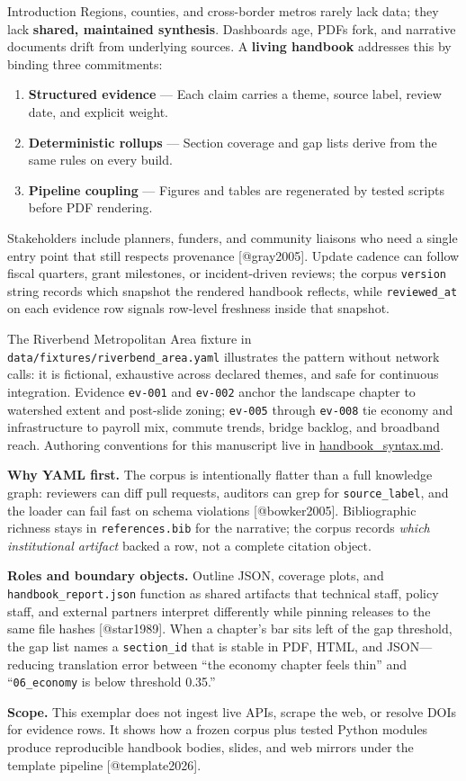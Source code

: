 \documentclass[
  ignorenonframetext,
]{beamer}
\author{\texorpdfstring{}{}}
\date{}
\providecommand{\tightlist}{%
  \setlength{\itemsep}{0pt}\setlength{\parskip}{0pt}}
\begin{document}
\begin{frame}[fragile]{Introduction}
\protect{}\label{introduction}
Regions, counties, and cross-border metros rarely lack data; they lack
\textbf{shared, maintained synthesis}. Dashboards age, PDFs fork, and
narrative documents drift from underlying sources. A \textbf{living
handbook} addresses this by binding three commitments:

\begin{enumerate}
\tightlist
\item
  \textbf{Structured evidence} --- Each claim carries a theme, source
  label, review date, and explicit weight.
\item
  \textbf{Deterministic rollups} --- Section coverage and gap lists
  derive from the same rules on every build.
\item
  \textbf{Pipeline coupling} --- Figures and tables are regenerated by
  tested scripts before PDF rendering.
\end{enumerate}

Stakeholders include planners, funders, and community liaisons who need
a single entry point that still respects provenance {[}@gray2005{]}.
Update cadence can follow fiscal quarters, grant milestones, or
incident-driven reviews; the corpus \texttt{version} string records
which snapshot the rendered handbook reflects, while
\texttt{reviewed\_at} on each evidence row signals row-level freshness
inside that snapshot.

The Riverbend Metropolitan Area fixture in
\texttt{data/fixtures/riverbend\_area.yaml} illustrates the pattern
without network calls: it is fictional, exhaustive across declared
themes, and safe for continuous integration. Evidence \texttt{ev-001}
and \texttt{ev-002} anchor the landscape chapter to watershed extent and
post-slide zoning; \texttt{ev-005} through \texttt{ev-008} tie economy
and infrastructure to payroll mix, commute trends, bridge backlog, and
broadband reach. Authoring conventions for this manuscript live in
\url{handbook_syntax.md}.

\textbf{Why YAML first.} The corpus is intentionally flatter than a full
knowledge graph: reviewers can diff pull requests, auditors can grep for
\texttt{source\_label}, and the loader can fail fast on schema
violations {[}@bowker2005{]}. Bibliographic richness stays in
\texttt{references.bib} for the narrative; the corpus records
\emph{which institutional artifact} backed a row, not a complete
citation object.

\textbf{Roles and boundary objects.} Outline JSON, coverage plots, and
\texttt{handbook\_report.json} function as shared artifacts that
technical staff, policy staff, and external partners interpret
differently while pinning releases to the same file hashes
{[}@star1989{]}. When a chapter's bar sits left of the gap threshold,
the gap list names a \texttt{section\_id} that is stable in PDF, HTML,
and JSON---reducing translation error between ``the economy chapter
feels thin'' and ``\texttt{06\_economy} is below threshold 0.35.''

\textbf{Scope.} This exemplar does not ingest live APIs, scrape the web,
or resolve DOIs for evidence rows. It shows how a frozen corpus plus
tested Python modules produce reproducible handbook bodies, slides, and
web mirrors under the template pipeline {[}@template2026{]}.
\end{frame}
\end{document}
